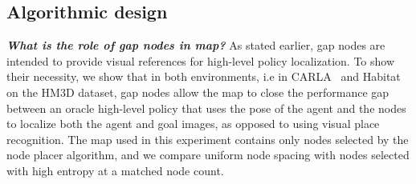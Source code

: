 \subsection{Algorithmic design}
\textit{\textbf{What is the role of gap nodes in map?}}
As stated earlier, gap nodes are intended to provide visual references for high-level policy localization. To show their necessity, we show that in both environments, i.e in CARLA~\cite{dosovitskiy2017carla} and Habitat~\cite{habitat19iccv} on the HM3D dataset, gap nodes allow the map to close the performance gap between an oracle high-level policy that uses the pose of the agent and the nodes to localize both the agent and goal images, as opposed to using visual place recognition. The map used in this experiment contains only nodes selected by the node placer algorithm, and we compare uniform node spacing with nodes selected with high entropy at a matched node count.
